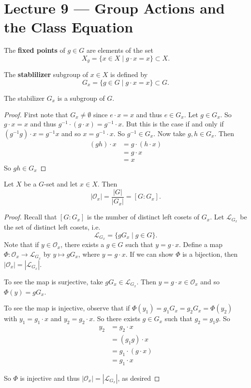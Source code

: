 \section{Lecture 9 — Group Actions and the Class Equation}

\begin{definition}
	The \textbf{fixed points} of $g\in G$ are elements of the set $$X_g=\{x\in X\mid g\cdot x=x\}\subset X.$$

	The \textbf{stablilizer} subgroup of $x\in X$ is defined by $$G_x=\{g\in G\mid g\cdot x=x\}\subset G.$$
\end{definition}

\begin{lemma}
	The stabilizer $G_x$ is a subgroup of $G$.
\end{lemma}

\begin{proof}
	First note that $G_x\neq\emptyset$ since $e\cdot x=x$ and thus $e\in G_x$. Let $g\in G_x$. So $g\cdot x=x$ and thus $g^{-1}\cdot (g\cdot x)=g^{-1}\cdot x$. But this is the case if and only if $(g^{-1}g)\cdot x=g^{-1}x$ and so $x=g^{-1}\cdot x$. So $g^{-1}\in G_x$. Now take $g,h\in G_x$. Then
	\begin{align*}
		(gh)\cdot x&=g\cdot (h\cdot x)\\
		&=g\cdot x\\
		&=x
	\end{align*}
	So $gh\in G_x$
\end{proof}

\begin{theorem}
	Let $X$ be a $G$-set and let $x\in X$. Then
	$$|\mathcal O_x|=\frac{|G|}{|G_x|}=[G:G_x].$$
\end{theorem}

\begin{proof}
	Recall that $[G:G_x]$ is the number of distinct left cosets of $G_x$. Let $\mathcal L_{G_x}$ be the set of distinct left cosets, i.e.
	$$\mathcal L_{G_x}=\{gG_x\mid g\in G\}.$$
	Note that if $y\in\mathcal O_x$, there exists a $g\in G$ such that $y=g\cdot x$. Define a map $\Phi\colon\mathcal O_x\to \mathcal L_{G_x}$ by $y\mapsto gG_x$, where $y=g\cdot x$. If we can show $\Phi$ is a bijection, then $|\mathcal O_x|=|\mathcal L_{G_x}|$.

	To see the map is surjective, take $gG_x\in\mathcal L_{G_x}$. Then $y=g\cdot x\in\mathcal O_x$ and so $\Phi(y)=gG_x$.

	To see the map is injective, observe that if $\Phi(y_1)=g_1G_x=g_2G_x=\Phi(y_2)$ with $y_1=g_1\cdot x$ and $y_2=g_2\cdot x$. So there exists $g\in G_x$ such that $g_2=g_1g$. So
	\begin{align*}
		y_2&=g_2\cdot x\\
		&=(g_1g)\cdot x\\
		&=g_1\cdot (g\cdot x)\\
		&=g_1\cdot x
	\end{align*}

	So $\Phi$ is injective and thus $|\mathcal O_x|=|\mathcal L_{G_x}|$, as desired
\end{proof}

